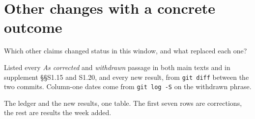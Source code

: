 \section{Other changes with a concrete outcome}

\Q Which other claims changed status in this window, and what replaced each one?

\D Listed every \emph{As corrected} and \emph{withdrawn} passage in both main texts and in
supplement §§S1.15 and S1.20, and every new result, from \texttt{git diff} between the two
commits. Column-one dates come from \texttt{git log -S} on the withdrawn phrase.

\F The ledger and the new results, one table. The first seven rows are corrections, the rest
are results the week added.

